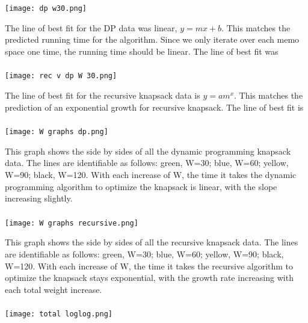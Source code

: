 \documentclass{article}
\begin{document}
\texttt{[image: dp w30.png]}

The line of best fit for the DP data was linear, $y = mx + b$.  This matches the predicted running time for the algorithm.  Since we only iterate over each memo space one time, the running time should be linear.  The line of best fit was 

\subsubsection*{}

\texttt{[image: rec v dp W 30.png]}

The line of best fit for the recursive knapsack data is $y = am^x$.  This matches the prediction of an exponential growth for recursive knapsack.  The line of best fit is 

\subsubsection*{}

\texttt{[image: W graphs dp.png]}

This graph shows the side by sides of all the dynamic programming knapsack data.  The lines are identifiable as follows: green, W=30; blue, W=60; yellow, W=90; black, W=120.  With each increase of W, the time it takes the dynamic programming algorithm to optimize the knapsack is linear, with the slope increasing slightly.

\subsubsection*{}

\texttt{[image: W graphs recursive.png]}

This graph shows the side by sides of all the recursive knapsack data.  The lines are identifiable as follows: green, W=30; blue, W=60; yellow, W=90; black, W=120.  With each increase of W, the time it takes the recursive algorithm to optimize the knapsack stays exponential, with the growth rate increasing with each total weight increase.

\subsubsection*{}

\texttt{[image: total loglog.png]}
\end{document}
